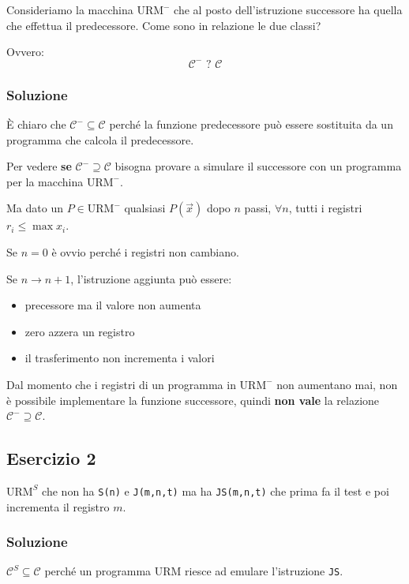 Consideriamo la macchina $ \text{URM}^- $ che al posto dell'istruzione successore ha quella che effettua il predecessore.
Come sono in relazione le due classi? 

Ovvero:
 $$\mathcal{C}^- \text{ ? } \mathcal{C}$$
 
 \subsubsection{Soluzione}
 
 \`{E} chiaro che  $\mathcal{C}^- \subseteq \mathcal{C}$ perché la funzione predecessore può essere sostituita da un programma che calcola il predecessore.
 
 Per vedere \textbf{se}  $\mathcal{C}^- \supseteq \mathcal{C}$ bisogna provare a simulare il successore con un programma per la macchina $ \text{URM}^- $.

Ma dato un $ P \in \text{URM}^- $ qualsiasi $ P(\vec{x}) $ dopo $ n $ passi, $ \forall n $, tutti i registri $ r_i \leq \max x_i$.

Se $ n = 0 $ è ovvio perché i registri non cambiano.

Se $ n \rightarrow n+1 $, l'istruzione aggiunta può essere:
\begin{itemize}
	\item precessore ma il valore non aumenta
	\item zero azzera un registro
	\item il trasferimento non incrementa i valori
\end{itemize}

Dal momento che i registri di un programma in $ \text{URM}^- $ non aumentano mai, non è possibile implementare la funzione successore, quindi \textbf{non vale} la relazione $\mathcal{C}^- \supseteq \mathcal{C}$.


\subsection{Esercizio 2}
$ \text{URM}^S$ che non ha \texttt{S(n)} e \texttt{J(m,n,t)} ma ha \texttt{JS(m,n,t)} che prima fa il test e poi incrementa il registro $ m $.

\subsubsection{Soluzione}

$\mathcal{C}^S \subseteq \mathcal{C}$ perché un programma URM riesce ad emulare l'istruzione \texttt{JS}.

